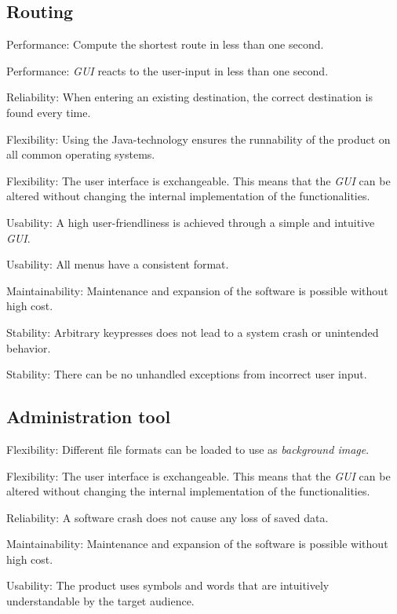 
\subsection{Routing}
\begin{numerate}[NF]
\item Performance: Compute the shortest route in less than one second.
\item Performance: \textit{GUI} reacts to the user-input in less than one second.
\item Reliability: When entering an existing destination, the correct destination is found every time.
\item Flexibility: Using the Java-technology ensures the runnability of the product on all common operating systems.
\item Flexibility: The user interface is exchangeable. This means that the \textit{GUI} can be altered without changing the internal implementation of the functionalities.
\item Usability: A high user-friendliness is achieved through a simple and intuitive \textit{GUI}.
\item Usability: All menus have a consistent format.
\item Maintainability: Maintenance and expansion of the software is possible without high cost.
\item Stability: Arbitrary keypresses does not lead to a system crash or unintended behavior.
\item Stability: There can be no unhandled exceptions from incorrect user input.
\end{numerate}

\subsection{Administration tool}
\begin{numerate}[NF]
\item Flexibility: Different file formats can be loaded to use as \textit{background image}.
\item Flexibility: The user interface is exchangeable. This means that the \textit{GUI} can be altered without changing the internal implementation of the functionalities.
\item Reliability: A software crash does not cause any loss of saved data.
\item Maintainability: Maintenance and expansion of the software is possible without high cost.
\item Usability: The product uses symbols and words that are intuitively understandable by the target audience.
\end{numerate}
